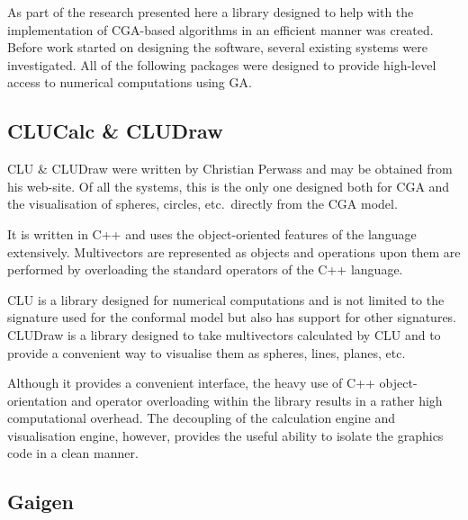 As part of the research presented here a library designed to help with the
implementation of CGA-based algorithms in an efficient manner was created.
Before work started on designing the software, several existing systems were
investigated. All of the following packages were designed to provide
high-level access to numerical computations using GA.

\subsection{CLUCalc \& CLUDraw}


CLU \& CLUDraw were written by Christian Perwass and may be obtained from his
web-site\cite{CLU}. Of all the systems, this
is the only one designed both for CGA and the visualisation of spheres,
circles, etc.\ directly from the CGA model.

It is written in C++ and uses the object-oriented features of the language
extensively. Multivectors are represented as objects and operations upon
them are performed by overloading the standard operators of the C++
language. 

CLU is a library designed for numerical computations and is not limited
to the signature used for the conformal model but also has support for
other signatures. CLUDraw is a library designed to take multivectors calculated
by CLU and to provide a convenient way to visualise them as spheres, lines, planes,
etc. 

Although it provides a convenient interface, the heavy use of C++ object-orientation
and operator overloading within the library results in a rather high
computational overhead. The decoupling of the calculation engine and
visualisation engine, however, provides the useful ability to isolate the
graphics code in a clean manner.


%

\subsection{Gaigen}

